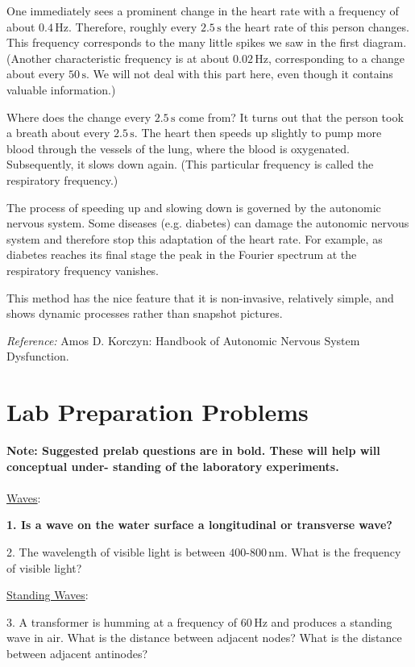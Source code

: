 One immediately sees a prominent change in the heart rate with a frequency of about $0.4\, \textrm{Hz}$. Therefore, roughly every $2.5\, \textrm{s}$ the heart rate of this person changes. This frequency corresponds to the many little spikes we saw in the first diagram. (Another characteristic frequency is at about $0.02\, \textrm{Hz}$, corresponding to a change about every $50\, \textrm{s}$. We will not deal with this part here, even though it contains valuable information.)\myskip

Where does the change every $2.5\, \textrm{s}$ come from? It turns out that the person took a breath about every $2.5\, \textrm{s}$. The heart then speeds up slightly to pump more blood through the vessels of the lung, where the blood is oxygenated. Subsequently, it slows down again. (This particular frequency is called the respiratory frequency.)\myskip

The process of speeding up and slowing down is governed by the autonomic nervous system. Some diseases (e.g. diabetes) can damage the autonomic nervous system and therefore stop this adaptation of the heart rate. For example, as diabetes reaches its final stage the peak in the Fourier spectrum at the respiratory frequency vanishes. \myskip

This method has the nice feature that it is non-invasive, relatively simple, and shows dynamic processes rather than snapshot pictures.\myskip

\emph{Reference:} Amos D. Korczyn: Handbook of Autonomic Nervous System Dysfunction.
\section{Lab Preparation Problems}
\myskip
{\bf{Note: Suggested prelab questions are in bold. These will help will conceptual under- standing of the laboratory experiments.}}
\\
\\
\noindent\underline{Waves}:\myskip

{\bf{1. Is a wave on the water surface a longitudinal or transverse wave?}}\myskip

2. The wavelength of visible light is between $400$-$800\, \textrm{nm}$. What is the frequency of visible light?\myskip

\noindent\underline{Standing Waves}:\myskip

 3. A transformer is humming at a frequency of $60\, \textrm{Hz}$ and produces a standing wave in air. What is the distance between adjacent nodes? What is the distance between adjacent antinodes? \myskip

